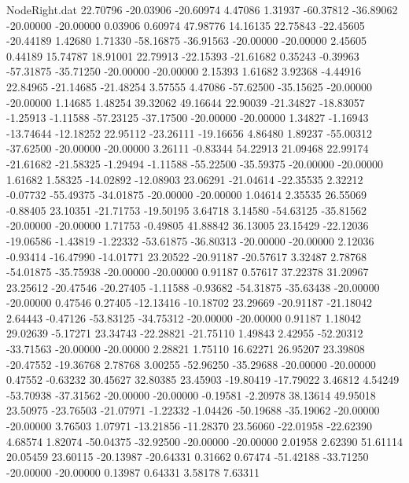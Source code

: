 \begin{filecontents}{NodeRight.dat}
  22.70796  -20.03906  -20.60974     4.47086    1.31937  -60.37812  -36.89062  -20.00000  -20.00000    0.03906    0.60974   47.98776   14.16135
  22.75843  -22.45605  -20.44189     1.42680    1.71330  -58.16875  -36.91563  -20.00000  -20.00000    2.45605    0.44189   15.74787   18.91001
  22.79913  -22.15393  -21.61682     0.35243   -0.39963  -57.31875  -35.71250  -20.00000  -20.00000    2.15393    1.61682    3.92368   -4.44916
  22.84965  -21.14685  -21.48254     3.57555    4.47086  -57.62500  -35.15625  -20.00000  -20.00000    1.14685    1.48254   39.32062   49.16644
  22.90039  -21.34827  -18.83057    -1.25913   -1.11588  -57.23125  -37.17500  -20.00000  -20.00000    1.34827   -1.16943  -13.74644  -12.18252
  22.95112  -23.26111  -19.16656     4.86480    1.89237  -55.00312  -37.62500  -20.00000  -20.00000    3.26111   -0.83344   54.22913   21.09468
  22.99174  -21.61682  -21.58325    -1.29494   -1.11588  -55.22500  -35.59375  -20.00000  -20.00000    1.61682    1.58325  -14.02892  -12.08903
  23.06291  -21.04614  -22.35535     2.32212   -0.07732  -55.49375  -34.01875  -20.00000  -20.00000    1.04614    2.35535   26.55069   -0.88405
  23.10351  -21.71753  -19.50195     3.64718    3.14580  -54.63125  -35.81562  -20.00000  -20.00000    1.71753   -0.49805   41.88842   36.13005
  23.15429  -22.12036  -19.06586    -1.43819   -1.22332  -53.61875  -36.80313  -20.00000  -20.00000    2.12036   -0.93414  -16.47990  -14.01771
  23.20522  -20.91187  -20.57617     3.32487    2.78768  -54.01875  -35.75938  -20.00000  -20.00000    0.91187    0.57617   37.22378   31.20967
  23.25612  -20.47546  -20.27405    -1.11588   -0.93682  -54.31875  -35.63438  -20.00000  -20.00000    0.47546    0.27405  -12.13416  -10.18702
  23.29669  -20.91187  -21.18042     2.64443   -0.47126  -53.83125  -34.75312  -20.00000  -20.00000    0.91187    1.18042   29.02639   -5.17271
  23.34743  -22.28821  -21.75110     1.49843    2.42955  -52.20312  -33.71563  -20.00000  -20.00000    2.28821    1.75110   16.62271   26.95207
  23.39808  -20.47552  -19.36768     2.78768    3.00255  -52.96250  -35.29688  -20.00000  -20.00000    0.47552   -0.63232   30.45627   32.80385
  23.45903  -19.80419  -17.79022     3.46812    4.54249  -53.70938  -37.31562  -20.00000  -20.00000   -0.19581   -2.20978   38.13614   49.95018
  23.50975  -23.76503  -21.07971    -1.22332   -1.04426  -50.19688  -35.19062  -20.00000  -20.00000    3.76503    1.07971  -13.21856  -11.28370
  23.56060  -22.01958  -22.62390     4.68574    1.82074  -50.04375  -32.92500  -20.00000  -20.00000    2.01958    2.62390   51.61114   20.05459
  23.60115  -20.13987  -20.64331     0.31662    0.67474  -51.42188  -33.71250  -20.00000  -20.00000    0.13987    0.64331    3.58178    7.63311

\end{filecontents}
